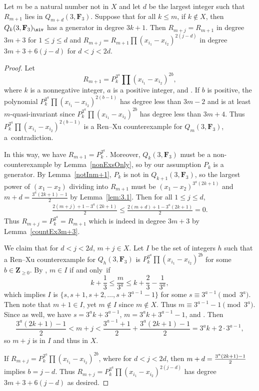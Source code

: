\begin{Lemma}\label{staircase}
 Let $m$ be a natural number not in $X$ and let $d$ be the largest integer such that $R_{m+1}$ lies in $Q_{m+d}(3,\mathbf{F}_3)$. Suppose that for all $k\leq m$, if $k\not\in X$, then $Q_k(3,\mathbf{F}_3)_\siv$ has a generator in degree $3k+1$. Then $R_{m+j}=R_{m+1}$ in degree $3m+3$ for $1\leq j\leq d$ and $R_{m+j}=R_{m+1}\prod (x_{i_1}-x_{i_2})^{2(j-d)}$ in degree $3m+3+6(j-d)$ for $d< j<2d$.
\end{Lemma}
\begin{proof}
 Let
 \[
 R_{m+1}=P_k^{3^a}\prod(x_{i_1}-x_{i_2})^{2b},
 \]
 where $k$ is a nonnegative integer, $a$ is a positive integer, and . If $b$ is positive, the polynomial $P_k^{3^a}\prod(x_{i_1}-x_{i_2})^{2(b-1)}$ has degree less than $3m-2$ and is at least $m$-quasi-invariant since $P_k^{3^a}\prod(x_{i_1}-x_{i_2})^{2b}$ has degree less than $3m+4$. Thus $P_k^{3^a}\prod(x_{i_1}-x_{i_2})^{2(b-1)}$ is a Ren--Xu counterexample for $Q_m(3,\mathbf{F}_3)$, a~contradiction.

 In this way, we have $R_{m+1}=P_k^{3^a}$. Moreover, $Q_k(3,\mathbf{F}_3)$ must be a non-counterexample by Lemma~\ref{nonExsOnly}, so by our assumption $P_k$ is a generator. By Lemma~\ref{notInm+1}, $P_k$ is not in $Q_{k+1}(3,\mathbf{F}_3)$, so the largest power of $(x_1-x_2)$ dividing into $R_{m+1}$ must be $(x_1-x_2)^{3^a(2k+1)}$ and $m+d=\frac{3^a(2k+1)-1}{2}$ by Lemma~\ref{lem:3.1}. Then for all $1\leq j\leq d$,
 \begin{align*}
 \frac{2(m+j)+1-3^a(2k+1)}{2} \leq \frac{2(m+d)+1-3^a(2k+1)}{2}= 0.
 \end{align*}
 Thus $R_{m+j}=P_k^{3^a}=R_{m+1}$ which is indeed in degree $3m+3$ by Lemma~\ref{countEx3m+3}.

 We claim that for $d<j< 2d$, $m+j\in X$. Let $I$ be the set of integers $h$ such that a Ren--Xu counterexample for $Q_h(3,\mathbf{F}_3)$ is $P_k^{3^a}\prod(x_{i_1}-x_{i_2})^{2b}$ for some $b\in \mathbf{Z}_{\geq 0}$. By \cite{Ren_2020}, $m\in I$ if and only~if
 \[k+\frac{1}{3}\leq \frac{m}{3^a}\leq k+\frac{2}{3}-\frac{1}{3^a},\]
 which implies $I$ is $\bigl\{s,s+1,s+2,\ldots,s+3^{a-1}-1\bigr\}$ for some $s\equiv 3^{a-1} \pmod{3^a}$. Then note that $m+1\in I$, yet $m\not\in I$ since $m\not\in X$. Thus $m\equiv 3^{a-1}-1\pmod{3^a}$. Since  as well, we have $s=3^ak+3^{a-1}$, $m=3^ak+3^{a-1}-1$, and . Then
 \[\frac{3^a(2k+1)-1}{2}< m+j< \frac{3^{a-1}+1}{2}+ \frac{3^a(2k+1)-1}{2} = 3^ak+2\cdot 3^{a-1},\]
 so $m+j$ is in $I$ and thus in $X$.

If $R_{m+j}=P_k^{3^a}\prod(x_{i_1}-x_{i_2})^{2b}$, where  for $d<j< 2d$, then $m+d=\smash{\frac{3^a(2k+1)-1}{2}}$ implies $b=j-d$. Thus $R_{m+j}=P_k^{3^a}\prod(x_{i_1}-x_{i_2})^{2(j-d)}$ has degree $3m+3+6(j-d)$ as desired.
\end{proof}

